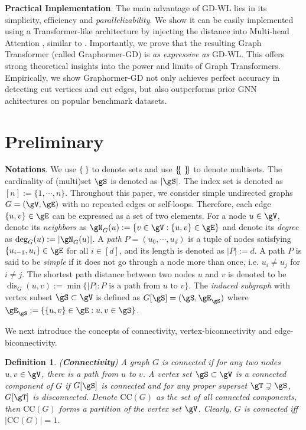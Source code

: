 \documentclass{article}
\newtheorem{definition}[theorem]{Definition}
\newcommand*{\ldblbrace}{\{\mskip-5mu\{}
\newcommand*{\rdblbrace}{\}\mskip-5mu\}}
\newcommand*{\dis}{{\operatorname{dis}}}
\begin{document}
\textbf{Practical Implementation}.
The main advantage of GD-WL lies in its simplicity, efficiency and \emph{parallelizability}. We show it can be easily implemented using a Transformer-like architecture by injecting the distance into Multi-head Attention , similar to . Importantly, we prove that the resulting Graph Transformer (called Graphormer-GD) is \emph{as expressive as} GD-WL. This offers strong theoretical insights into the power and limits of Graph Transformers. Empirically, we show Graphormer-GD not only achieves perfect accuracy in detecting cut vertices and cut edges, but also outperforms prior GNN achitectures on popular benchmark datasets.
\vspace{-2pt}

\section{Preliminary}
\label{sec:preliminary}
\vspace{-1pt}
\textbf{Notations}. We use $\{\ \}$ to denote sets and use $\ldblbrace\ \rdblbrace$ to denote multisets. The cardinality of (multi)set $\gS$ is denoted as $|\gS|$. The index set is denoted as $[n]:=\{1,\cdots,n\}$. Throughout this paper, we consider simple undirected graphs $G=(\gV,\gE)$ with no repeated edges or self-loops. Therefore, each edge $\{u,v\}\in\gE$ can be expressed as a set of two elements. For a node $u\in\gV$, denote its \emph{neighbors} as $\gN_G(u):=\{v\in\gV:\{u,v\}\in\gE\}$ and denote its \emph{degree} as $\deg_G(u):=|\gN_G(u)|$. A \emph{path} $P=(u_0,\cdots,u_d)$ is a tuple of nodes satisfying $\{u_{i-1},u_i\}\in\gE$ for all $i\in[d]$, and its length is denoted as $|P|:=d$. A path $P$ is said to be \emph{simple} if it does not go through a node more than once, i.e. $u_i\neq u_j$ for $i\neq j$. The shortest path distance between two nodes $u$ and $v$ is denoted to be $\dis_G(u,v):=\min\{|P|:P\text{ is a path from }u\text{ to }v\}$. The \emph{induced subgraph} with vertex subset $\gS\subset\gV$ is defined as $G[\gS]=(\gS,\gE_\gS)$ where $\gE_\gS:=\{\{u,v\}\in\gE:u,v\in\gS\}$.

We next introduce the concepts of connectivity, vertex-biconnectivity and edge-biconnectivity.

\begin{definition}
\label{connectivity}
\normalfont (\textbf{Connectivity}) A graph $G$ is \emph{connected} if for any two nodes $u,v\in\gV$, there is a path from $u$ to $v$. A vertex set $\gS\subset\gV$ is a \emph{connected component} of $G$ if $G[\gS]$ is connected and for any proper superset $\gT\supsetneq\gS$, $G[\gT]$ is disconnected. Denote $\mathrm{CC}(G)$ as the set of all connected components, then $\mathrm{CC}(G)$ forms a \emph{partition} of the vertex set $\gV$. Clearly, $G$ is connected iff $|\mathrm{CC}(G)|=1$.
\end{definition}
\end{document}
